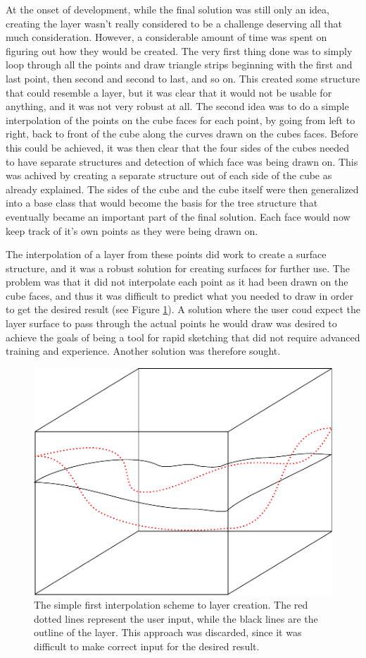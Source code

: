 \documentclass[a4paper,12pt]{report}
\begin{document}
\label{subsec:layers}
At the onset of development, while the final solution was still only an idea, creating the layer wasn't really considered to be a challenge deserving all that much consideration. However, a considerable amount of time was spent on figuring out how they would be created. The very first thing done was to simply loop through all the points and draw triangle strips beginning with the first and last point, then second and second to last, and so on. This created some structure that could resemble a layer, but it was clear that it would not be usable for anything, and it was not very robust at all. The second idea was to do a simple interpolation of the points on the cube faces for each point, by going from left to right, back to front of the cube along the curves drawn on the cubes faces. Before this could be achieved, it was then clear that the four sides of the cubes needed to have separate structures and detection of which face was being drawn on. This was achived by creating a separate structure out of each 
side of the cube as already explained. The sides of the cube and the cube itself were then generalized into a base class that would become the basis for the tree structure that eventually became an important part of the final solution. Each face would now keep track of it's own points as they were being drawn on.

The interpolation of a layer from these points did work to create a surface structure, and it was a robust solution for creating surfaces for further use. The problem was that it did not interpolate each point as it had been drawn on the cube faces, and thus it was difficult to predict what you needed to draw in order to get the desired result (see Figure \ref{fig:layerSimpleInterpol}). A solution where the user coud expect the layer surface to pass through the actual points he would draw was desired to achieve the goals of being a tool for rapid sketching that did not require advanced training and experience. Another solution was therefore sought.

\begin{figure}
 \centering
\includegraphics[width=.75\linewidth]{thesis/layerSimpleInterpol.pdf}
 \caption{The simple first interpolation scheme to layer creation. The red dotted lines represent the user input, while the black lines are the outline of the layer. This approach was discarded, since it was difficult to make correct input for the desired result.}
 \label{fig:layerSimpleInterpol}
\end{figure}
\end{document}
